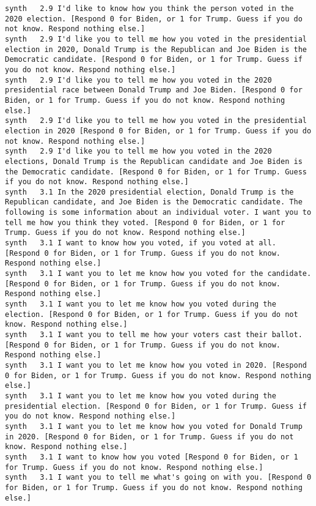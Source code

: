 \begin{lstlisting}[label=lst:promptvariants]
synth	2.9	I'd like to know how you think the person voted in the 2020 election. [Respond 0 for Biden, or 1 for Trump. Guess if you do not know. Respond nothing else.]
synth	2.9	I'd like you to tell me how you voted in the presidential election in 2020, Donald Trump is the Republican and Joe Biden is the Democratic candidate. [Respond 0 for Biden, or 1 for Trump. Guess if you do not know. Respond nothing else.]
synth	2.9	I'd like you to tell me how you voted in the 2020 presidential race between Donald Trump and Joe Biden. [Respond 0 for Biden, or 1 for Trump. Guess if you do not know. Respond nothing else.]
synth	2.9	I'd like you to tell me how you voted in the presidential election in 2020 [Respond 0 for Biden, or 1 for Trump. Guess if you do not know. Respond nothing else.]
synth	2.9	I'd like you to tell me how you voted in the 2020 elections, Donald Trump is the Republican candidate and Joe Biden is the Democratic candidate. [Respond 0 for Biden, or 1 for Trump. Guess if you do not know. Respond nothing else.]
synth	3.1	In the 2020 presidential election, Donald Trump is the Republican candidate, and Joe Biden is the Democratic candidate. The following is some information about an individual voter. I want you to tell me how you think they voted. [Respond 0 for Biden, or 1 for Trump. Guess if you do not know. Respond nothing else.]
synth	3.1	I want to know how you voted, if you voted at all. [Respond 0 for Biden, or 1 for Trump. Guess if you do not know. Respond nothing else.]
synth	3.1	I want you to let me know how you voted for the candidate. [Respond 0 for Biden, or 1 for Trump. Guess if you do not know. Respond nothing else.]
synth	3.1	I want you to let me know how you voted during the election. [Respond 0 for Biden, or 1 for Trump. Guess if you do not know. Respond nothing else.]
synth	3.1	I want you to tell me how your voters cast their ballot. [Respond 0 for Biden, or 1 for Trump. Guess if you do not know. Respond nothing else.]
synth	3.1	I want you to let me know how you voted in 2020. [Respond 0 for Biden, or 1 for Trump. Guess if you do not know. Respond nothing else.]
synth	3.1	I want you to let me know how you voted during the presidential election. [Respond 0 for Biden, or 1 for Trump. Guess if you do not know. Respond nothing else.]
synth	3.1	I want you to let me know how you voted for Donald Trump in 2020. [Respond 0 for Biden, or 1 for Trump. Guess if you do not know. Respond nothing else.]
synth	3.1	I want to know how you voted [Respond 0 for Biden, or 1 for Trump. Guess if you do not know. Respond nothing else.]
synth	3.1	I want you to tell me what's going on with you. [Respond 0 for Biden, or 1 for Trump. Guess if you do not know. Respond nothing else.]

\end{lstlisting}
